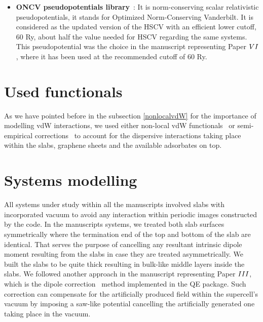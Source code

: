 \begin{itemize}
\item \textbf{ONCV pseudopotentials library}~\cite{Schlipf2015}: It is norm-conserving scalar relativistic pseudopotentials, it stands for Optimized Norm-Conserving Vanderbilt. It is considered as the updated version of the HSCV with an efficient lower cutoff, 60 Ry, about half the value needed for HSCV regarding the same systems. This pseudopotential was the choice in the manuscript representing Paper \hyperref[P6]{$\Rmnum{6}$}, where it has been used at the recommended cutoff of 60 Ry.
\end{itemize}
\section{Used functionals}
As we have pointed before in the subsection \ref{nonlocalvdW} for the importance of modelling vdW interactions, we used either non-local vdW functionals~\cite{Berland2014vdWxc} or semi-empirical corrections~\cite{Grimme2004, Grimme2006} to account for the dispersive interactions taking place within the slabs, graphene sheets and the available adsorbates on top.
\section{Systems modelling}
All systems under study within all the manuscripts involved slabs with incorporated vacuum to avoid any interaction within periodic images constructed by the code. In the manuscripts systems, we treated both slab surfaces symmetrically where the termination end of the top and bottom of the slab are identical. That serves the purpose of cancelling any resultant intrinsic dipole moment resulting from the slabs in case they are treated asymmetrically. We built the slabs to be quite thick resulting in bulk-like middle layers inside the slabs. We followed another approach in the manuscript representing Paper \hyperref[P3]{$\Rmnum{3}$}, which is the dipole correction~\cite{Bengtsson1999} method implemented in the QE package. Such correction can compensate for the artificially produced field within the supercell's vacuum by imposing a saw-like potential cancelling the artificially generated one taking place in the vacuum.
